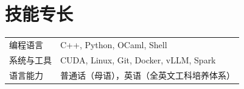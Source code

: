 \documentclass[a4paper,12pt]{article}
\begin{document}

\section{技能专长}
\begin{tabularx}{\linewidth}{@{}l X@{}}
编程语言 &  \normalsize{C++, Python, OCaml, Shell} \\
系统与工具 & \normalsize{CUDA, Linux, Git, Docker, vLLM, Spark} \\
语言能力 &  \normalsize{普通话（母语），英语（全英文工科培养体系）} \\
\end{tabularx}

\vfill
{}
\end{document}
